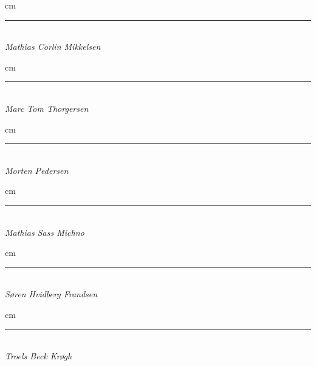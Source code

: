\begin{minipage}{\textwidth}
\vspace{5cm}
\begin{flushleft}
			 cm
			\Large
      \begin{minipage}{0.45\textwidth}
      \centering
      \rule{\textwidth}{0.5pt}\\
			\textit{Mathias Corlin Mikkelsen}
      \end{minipage}
		\end{flushleft}
		\begin{flushright}
			 cm
			\Large
      \begin{minipage}{0.45\textwidth}
      \centering
      \rule{\textwidth}{0.5pt}\\
			\textit{Marc Tom Thorgersen}
		  \end{minipage}
    \end{flushright}
		\begin{flushleft}
			\parindent=2 cm
			\Large
      \begin{minipage}{0.45\textwidth}
      \centering
      \rule{\textwidth}{0.5pt}\\
			\textit{Morten Pedersen}
		  \end{minipage}
    \end{flushleft}
		\begin{flushright}
			\hangindent=2 cm
			\Large
      \begin{minipage}{0.45\textwidth}
      \centering
      \rule{\textwidth}{0.5pt}\\
			\textit{Mathias Sass Michno}
		  \end{minipage}
    \end{flushright}
		\begin{flushleft}
			 cm
			\Large
      \begin{minipage}{0.45\textwidth}
      \centering
      \rule{\textwidth}{0.5pt}\\
			\textit{Søren Hvidberg Frandsen}
		  \end{minipage}
    \end{flushleft}
		\begin{flushright}
			 cm
			\Large
      \begin{minipage}{0.45\textwidth}
      \centering
      \rule{\textwidth}{0.5pt}\\
			\textit{Troels Beck Krøgh}
		  \end{minipage}
    \end{flushright}
\end{minipage}